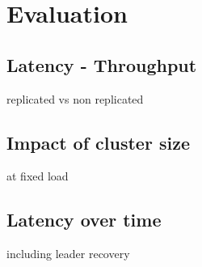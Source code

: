 \chapter{Evaluation}

\section{Latency - Throughput}

replicated vs non replicated

\section{Impact of cluster size}

at fixed load

\section{Latency over time}

including leader recovery


